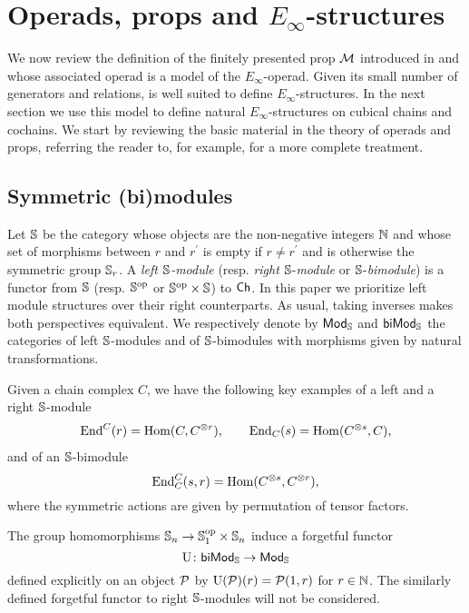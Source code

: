 
\section{Operads, props and \texorpdfstring{${E_\infty}$}{E-infty}-structures} \label{s:operads and props}

We now review the definition of the finitely presented prop $\mathcal{M}$ introduced in \cite{medina2020prop1} and whose associated operad is a model of the $E_\infty$-operad.
Given its small number of generators and relations, is well suited to define $E_\infty$-structures.
In the next section we use this model to define natural $E_\infty$-structures on cubical chains and cochains.
We start by reviewing the basic material in the theory of operads and props, referring the reader to, for example, \cite{markl2008props} for a more complete treatment.

\subsection{Symmetric (bi)modules}

Let $\mathbb{S}$ be the category whose objects are the non-negative integers $\mathbb{N}$ and whose set of morphisms between $r$ and $r^\prime$ is empty if $r \neq r^\prime$ and is otherwise the symmetric group $\mathbb{S}_r$.
A \textit{left $\mathbb{S}$-module} (resp. \textit{right} $\mathbb{S}$-\textit{module} or $\mathbb{S}$-\textit{bimodule}) is a functor from $\mathbb{S}$ (resp. $\mathbb{S}^{\mathrm{op}}$ or $\mathbb{S}^{\mathrm{op}} \times \mathbb{S}$) to $\mathsf{Ch}$.
In this paper we prioritize left module structures over their right counterparts.
As usual, taking inverses makes both perspectives equivalent.
We respectively denote by $\mathsf{Mod}_{\mathbb{S}}$ and $\mathsf{biMod}_{\mathbb{S}}$ the categories of left $\mathbb{S}$-modules and of $\mathbb{S}$-bimodules with morphisms given by natural transformations.

Given a chain complex $C$, we have the following key examples of a left and a right $\mathbb{S}$-module
\begin{gather*}
	\mathrm{End}^C(r) = \mathrm{Hom}(C, C^{\otimes r}), \qquad
	\mathrm{End}_C(s) = \mathrm{Hom}(C^{\otimes s}, C),
\end{gather*}
and of an $\mathbb{S}$-bimodule
\[
\mathrm{End}^C_C(s, r) = \mathrm{Hom}(C^{\otimes s}, C^{\otimes r}),
\]
where the symmetric actions are given by permutation of tensor factors.

The group homomorphisms $\mathbb{S}_n \to \mathbb{S}_1^{\mathrm{op}} \times \mathbb{S}_n$ induce a forgetful functor
\begin{equation} \label{e:forgetful}
	\operatorname{U} \colon \mathsf{biMod}_{\mathbb{S}} \to \mathsf{Mod}_{\mathbb{S}}
\end{equation}
defined explicitly on an object $\mathcal{P}$ by $\operatorname{U}(\mathcal{P})(r) = \mathcal{P}(1, r)$ for $r \in \mathbb{N}$.
The similarly defined forgetful functor to right $\mathbb{S}$-modules will not be considered.

